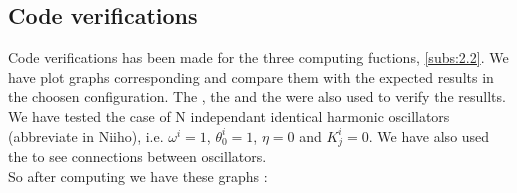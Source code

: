 \documentclass[1pt, a4paper]{article}
\begin{document}
\subsection{Code verifications}
\label{subs:4.2}
Code verifications has been made for the three computing fuctions, \autoref{subs:2.2}. We have plot graphs corresponding and compare them with the expected results in the choosen configuration. The , the  and the  were also used to verify the resullts. We have tested the case of N independant identical harmonic oscillators (abbreviate in Niiho), i.e. $\omega^i = 1$, $\theta_0^i = 1$, $\eta = 0$ and $K^i_j = 0$. We have also used the  to see connections between oscillators.\\
So after computing we have these graphs : 
\end{document}
